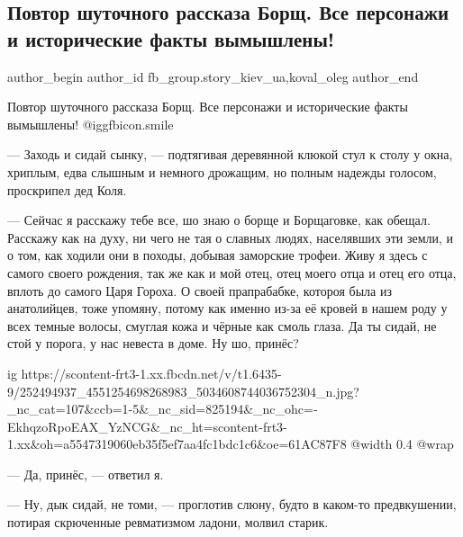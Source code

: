  
 
 
 
 
 
\subsection{Повтор шуточного рассказа Борщ. Все персонажи и исторические факты вымышлены!}
\label{sec:05_11_2021.fb.fb_group.story_kiev_ua.1.rasskaz_borsch}
 
\ifcmt
 author_begin
   author_id fb_group.story_kiev_ua,koval_oleg
 author_end
\fi

Повтор шуточного рассказа Борщ. Все персонажи и исторические факты вымышлены!
 @igg{fbicon.smile} 

— Заходь и сидай сынку, — подтягивая деревянной клюкой стул к столу у окна,
хриплым, едва слышным и немного дрожащим, но полным надежды голосом, проскрипел
дед Коля.

— Сейчас я расскажу тебе все, шо знаю о борще и Борщаговке, как обещал.
Расскажу как на духу, ни чего не тая о славных людях, населявших эти земли, и о
том, как ходили они в походы, добывая заморские трофеи. Живу я здесь с самого
своего рождения, так же как и мой отец, отец моего отца и отец его отца, вплоть
до самого Царя Гороха. О своей прапрабабке, котороя была из анатолийцев, тоже
упомяну, потому как именно из-за её кровей в нашем роду у всех темные волосы,
смуглая кожа и чёрные как смоль глаза. Да ты сидай, не стой у порога, у нас
невеста в доме. Ну шо, принёс?

\ifcmt
  ig https://scontent-frt3-1.xx.fbcdn.net/v/t1.6435-9/252494937_4551254698268983_5034608744036752304_n.jpg?_nc_cat=107&ccb=1-5&_nc_sid=825194&_nc_ohc=-EkhqzoRpoEAX_YzNCG&_nc_ht=scontent-frt3-1.xx&oh=a5547319060eb35f5ef7aa4fc1bdc1c6&oe=61AC87F8
  @width 0.4
  @wrap \parpic[r]
\fi

— Да, принёс, — ответил я.

— Ну, дык сидай, не томи, — проглотив слюну, будто в каком-то предвкушении,
потирая скрюченные ревматизмом ладони, молвил старик.

